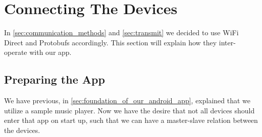 \section{Connecting The Devices}
In \cref{sec:communication_methods} and \cref{sec:transmit} we decided to use WiFi Direct and Protobufs accordingly.
This section will explain how they inter-operate with our app.

\subsection{Preparing the App}
We have previous, in \cref{sec:foundation_of_our_android_app}, explained that we utilize a sample music player.
Now we have the desire that not all devices should enter that app on start up, such that we can have a master-slave relation between the devices.

